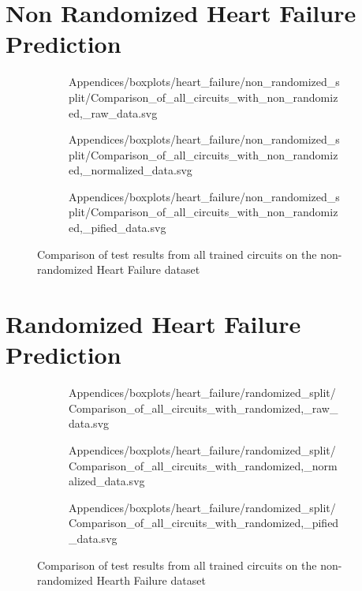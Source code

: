 \clearpage 
\section{Non Randomized Heart Failure Prediction}
\label{chapter:heart_failure_prediction_non_randomized}

\begin{figure}[!h]
    \begin{subfigure}{.5\textwidth}
        \centering
        
        {Appendices/boxplots/heart_failure/non_randomized_split/Comparison_of_all_circuits_with_non_randomized,_raw_data.svg}
    \end{subfigure}
    \begin{subfigure}{.5\textwidth}
        \centering
        
        {Appendices/boxplots/heart_failure/non_randomized_split/Comparison_of_all_circuits_with_non_randomized,_normalized_data.svg}
    \end{subfigure}
    \begin{subfigure}{.5\textwidth}
        \centering
        
        {Appendices/boxplots/heart_failure/non_randomized_split/Comparison_of_all_circuits_with_non_randomized,_pified_data.svg}
    \end{subfigure}
    \caption{Comparison of test results from all trained circuits on the non-randomized Heart Failure dataset}
    \label{fig:circuits_results_non_r_hf}
\end{figure}

\clearpage 
\section{Randomized Heart Failure Prediction}
\label{chapter:heart_failure_prediction_randomized}

\begin{figure}[!h]
    \begin{subfigure}{.5\textwidth}
        \centering
        
        {Appendices/boxplots/heart_failure/randomized_split/Comparison_of_all_circuits_with_randomized,_raw_data.svg}
    \end{subfigure}
    \begin{subfigure}{.5\textwidth}
        \centering
        
        {Appendices/boxplots/heart_failure/randomized_split/Comparison_of_all_circuits_with_randomized,_normalized_data.svg}
    \end{subfigure}
    \begin{subfigure}{.5\textwidth}
        \centering
        
        {Appendices/boxplots/heart_failure/randomized_split/Comparison_of_all_circuits_with_randomized,_pified_data.svg}
    \end{subfigure}
    \caption{Comparison of test results from all trained circuits on the non-randomized Hearth Failure dataset}
    \label{fig:circuits_results_r_hf}
\end{figure}

